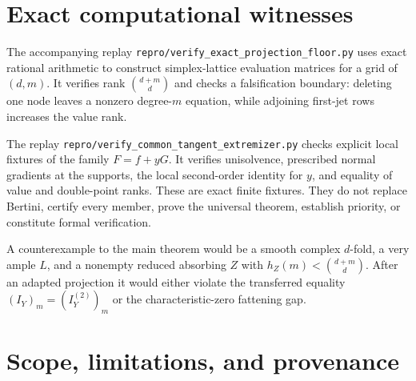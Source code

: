 \documentclass[11pt]{article}
\begin{document}
\section{Exact computational witnesses}\label{sec:replay}

The accompanying replay
\texttt{repro/verify\_exact\_projection\_floor.py} uses exact rational
arithmetic to construct simplex-lattice evaluation matrices for a grid of
$(d,m)$.  It verifies rank $\binom{d+m}{d}$ and checks a falsification
boundary: deleting one node leaves a nonzero degree-$m$ equation, while
adjoining first-jet rows increases the value rank.

The replay
\texttt{repro/verify\_common\_tangent\_extremizer.py} checks explicit local
fixtures of the family $F=f+yG$.  It verifies unisolvence, prescribed normal
gradients at the supports, the local second-order identity for $y$, and
equality of value and double-point ranks.  These are exact finite fixtures.
They do not replace Bertini, certify every member, prove the universal
theorem, establish priority, or constitute formal verification.

A counterexample to the main theorem would be a smooth complex $d$-fold, a
very ample $L$, and a nonempty reduced absorbing $Z$ with
$h_Z(m)<\binom{d+m}{d}$.  After an adapted projection it would either violate
the transferred equality $(I_Y)_m=(I_Y^{(2)})_m$ or the characteristic-zero
fattening gap.

\section{Scope, limitations, and provenance}\label{sec:scope}
\end{document}

